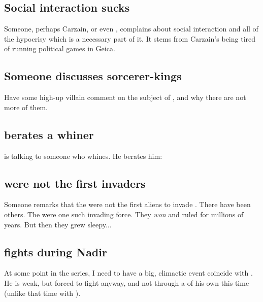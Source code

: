 \begin{garbage}
\subsection{Social interaction sucks}
Someone, perhaps Carzain, or even \Ishna, complains about social interaction and all of the hypocrisy which is a necessary part of it. It stems from Carzain's being tired of running political games in Geica.







\subsection{Someone discusses sorcerer-kings}
Have some high-up villain comment on the subject of , and why there are not more of them. 







\subsection{\Ishnaruchaefir{} berates a whiner}
\Ishnaruchaefir{} is talking to someone who whines. He berates him: 






\subsection{\Banes{} were not the first invaders}
Someone remarks that the \banes{} were not the first aliens to invade \Miith. 
There have been others. 
The \xss{} were one such invading force. 
They \emph{won} and ruled \Miith{} for millions of years. 
But then they grew sleepy...







\subsection{\Ishnaruchaefir{} fights during Nadir}
At some point in the series, I need to have a big, climactic event coincide with . 
He is weak, but forced to fight anyway, and not through a \XanatosGambit{} of his own this time (unlike that time with \Teshrial). 


\end{garbage}
